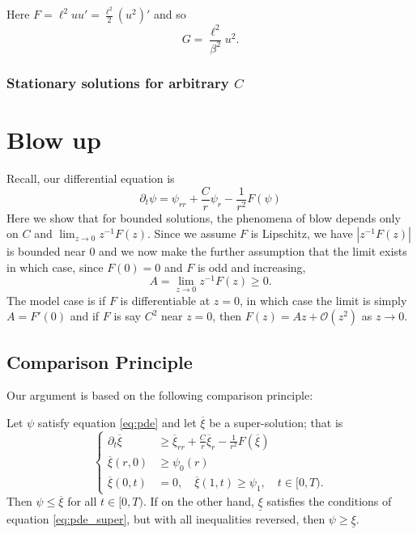 \documentclass{amsart}
\begin{document}
Here \(F = \ell^2 uu' = \tfrac{\ell^2}{2} (u^2)'\) and so
\[
G = \frac{\ell^2}{\beta^2} u^2.
\]
\subsubsection*{Stationary solutions for arbitrary \(C\)}

\section{Blow up}

Recall, our differential equation is
\[
\partial_t \psi = \psi_{rr} + \frac{C}{r} \psi_r - \frac{1}{r^2} F(\psi)
\]
Here we show that for bounded solutions, the phenomena of blow depends only on \(C\) and \(\lim_{z\to 0} z^{-1} F(z)\). Since we assume \(F\) is Lipschitz, we have \(|z^{-1} F(z)|\) is bounded near \(0\) and we now make the further assumption that the limit exists in which case, since \(F(0) = 0\) and \(F\) is odd and increasing,
\[
A = \lim_{z\to 0} z^{-1} F(z) \geq 0.
\]
The model case is if \(F\) is differentiable at \(z=0\), in which case the limit is simply \(A = F'(0)\) and if \(F\) is say \(C^2\) near \(z=0\), then \(F(z) = Az + \mathcal{O} (z^2)\) as \(z \to 0\).

\subsection{Comparison Principle}

Our argument is based on the following comparison principle:

\begin{thm}
Let \(\psi\) satisfy equation \eqref{eq:pde} and let \(\overline{\xi}\) be a super-solution; that is
\begin{equation}
\label{eq:pde_super}
\begin{cases}
\partial_t \overline{\xi} &\geq \overline{\xi}_{rr} + \frac{C}{r} \overline{\xi}_r - \frac{1}{r^2} F(\overline{\xi}) \\
\overline{\xi}(r, 0) &\geq \psi_0(r) \\
\overline{\xi}(0, t) &= 0, \quad \overline{\xi}(1, t) \geq \psi_1, \quad t \in [0, T).
\end{cases}
\end{equation}
Then \(\psi \leq \overline{\xi}\) for all \(t \in [0, T)\). If on the other hand, \(\underline{\xi}\) satisfies the conditions of equation \eqref{eq:pde_super}, but with all inequalities reversed, then \(\psi \geq \underline{\xi}\).
\end{thm}
\end{document}

